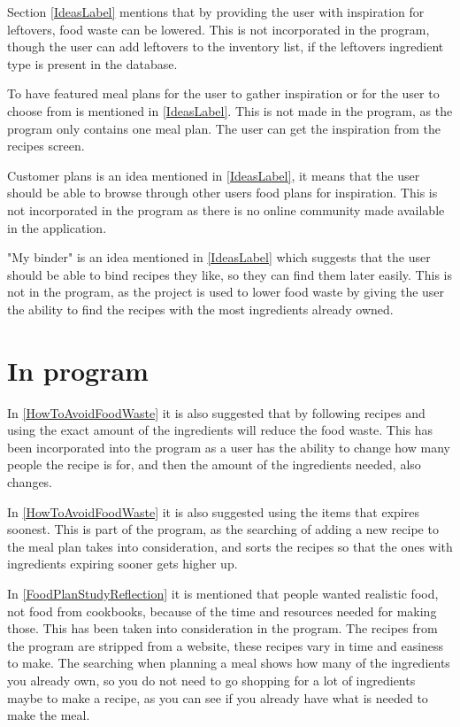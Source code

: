 Section \ref{IdeasLabel} mentions that by providing the user with inspiration for leftovers, food waste can be lowered. This is not incorporated in the program, though the user can add leftovers to the inventory list, if the leftovers ingredient type is present in the database.

To have featured meal plans for the user to gather inspiration or for the user to choose from is mentioned in \cref{IdeasLabel}. This is not made in the program, as the program only contains one meal plan. The user can get the inspiration from the recipes screen.

Customer plans is an idea mentioned in \cref{IdeasLabel}, it means that the user should be able to browse through other users food plans for inspiration. This is not incorporated in the program as there is no online community made available in the application.

"My binder" is an idea mentioned in \cref{IdeasLabel} which suggests that the user should be able to bind recipes they like, so they can find them later easily. This is not in the program, as the project is used to lower food waste by giving the user the ability to find the recipes with the most ingredients already owned.

\section{In program}

In \cref{HowToAvoidFoodWaste} it is also suggested that by following recipes and using the exact amount of the ingredients will reduce the food waste. This has been incorporated into the program as a user has the ability to change how many people the recipe is for, and then the amount of the ingredients needed, also changes.

In \cref{HowToAvoidFoodWaste} it is also suggested using the items that expires soonest. This is part of the program, as the searching of adding a new recipe to the meal plan takes into consideration, and sorts the recipes so that the ones with ingredients expiring sooner gets higher up.

In \cref{FoodPlanStudyReflection} it is mentioned that people wanted realistic food, not food from cookbooks, because of the time and resources needed for making those. This has been taken into consideration in the program. The recipes from the program are stripped from a website, these recipes vary in time and easiness to make. The searching when planning a meal shows how many of the ingredients you already own, so you do not need to go shopping for a lot of ingredients maybe to make a recipe, as you can see if you already have what is needed to make the meal.

